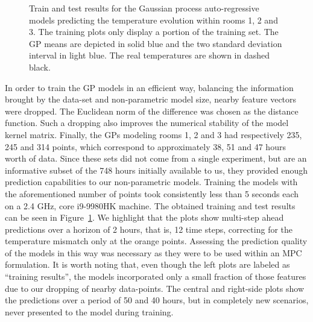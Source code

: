 {\begin{landscape}
\begin{figure}[!t]
{		Train and test results for the Gaussian process auto-regressive models predicting the temperature evolution within rooms 1, 2 and 3. The training plots only display a portion of the training set. The GP means are depicted in solid blue and the two standard deviation interval in light blue. The real temperatures are shown in dashed black.
	}
	\label{fig.trainTestRes}
\end{figure}
\end{landscape}
}

In order to train the GP models in an efficient way, balancing the information brought by the data-set and non-parametric model size, nearby feature vectors were dropped. The Euclidean norm of the difference was chosen as the distance function. Such a dropping also improves the numerical stability of the model kernel matrix. Finally, the GPs modeling rooms 1, 2 and 3 had respectively 235, 245 and 314 points, which correspond to approximately 38, 51 and 47 hours worth of data. Since these sets did not come from a single experiment, but are an informative subset of the 748 hours initially available to us, they provided enough prediction capabilities to our non-parametric models. Training the models with the aforementioned number of points took consistently less than 5 seconds each on a 2.4 GHz, core i9-9980HK machine. The obtained training and test results can be seen in Figure~\ref{fig.trainTestRes}. We highlight that the plots show multi-step ahead predictions over a horizon of 2 hours, that is, 12 time steps, correcting for the temperature mismatch only at the orange points. Assessing the prediction quality of the models in this way was necessary as they were to be used within an MPC formulation. It is worth noting that, even though the left plots are labeled as ``training results'', the models incorporated only a small fraction of those features due to our dropping of nearby data-points. The central and right-side plots show the predictions over a period of 50 and 40 hours, but in completely new scenarios, never presented to the model during training. 

